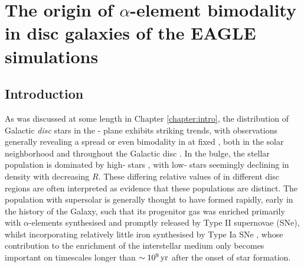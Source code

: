 \chapter{The origin of $\alpha$-element bimodality in disc galaxies of the EAGLE simulations}
\label{chapter:eagle}
\section{Introduction}
 \label{sec:intro}

As was discussed at some length in Chapter \ref{chapter:intro}, the distribution of Galactic  {\it disc} stars in the \afe{}-\feh{} plane exhibits striking trends, with observations generally revealing a spread or even bimodality in \afe{} at fixed \feh{}, both in the solar neighborhood \citep[e.g.][]{1998A&A...338..161F,2003A&A...410..527B,2000A&A...358..671G,2000AJ....120.2513P,2004AJ....128.1177V,2005A&A...433..185B,2012A&A...545A..32A,2014A&A...562A..71B} and throughout the Galactic disc \citep[][]{2014A&A...564A.115A,2014ApJ...796...38N,2015ApJ...808..132H}. In the bulge, the stellar population is dominated by high-\afe{} stars \citep[e.g.][]{2017arXiv170202971B}, with low-\afe{} stars seemingly declining in density with decreasing $R$. These differing relative values of \afe{} in different disc regions are often interpreted as evidence that these populations are distinct. The population with supersolar \afe{} is generally thought to have formed rapidly, early in the history of the Galaxy, such that its progenitor gas was enriched primarily with $\alpha$-elements synthesised and promptly released by Type II supernovae (SNe), whilst incorporating relatively little iron synthesised by Type Ia SNe \citep[e.g.,][]{1989ARA&A..27..279W,1997ARA&A..35..503M}, whose contribution to the enrichment of the interstellar medium only becomes important on timescales longer than $\sim 10^9\,{\rm yr}$ after the onset of star formation.

